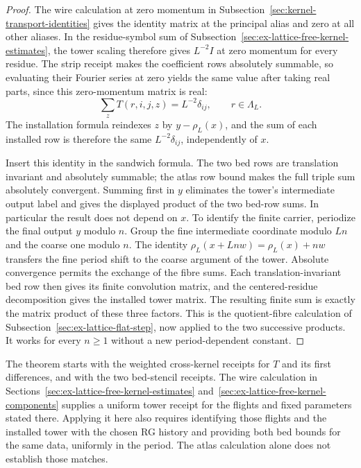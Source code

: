 \begin{proof}
The wire calculation at zero momentum in
Subsection~\ref{sec:kernel-transport-identities} gives the identity matrix at
the principal alias and zero at all other aliases. In the residue-symbol
sum of Subsection~\ref{sec:ex-lattice-free-kernel-estimates}, the tower scaling
therefore gives $L^{-2}I$ at zero momentum for every residue. The strip
receipt makes the coefficient rows absolutely summable, so evaluating their
Fourier series at zero yields the same value after taking real parts, since
this zero-momentum matrix is real:
\[
 \sum_z T(r,i,j,z)=L^{-2}\delta_{ij},\qquad r\in\Lambda_L.
\]
The installation formula reindexes $z$ by $y-\rho_L(x)$, and the sum of
each installed row is therefore the same $L^{-2}\delta_{ij}$, independently
of $x$.

Insert this identity in the sandwich formula. The two bed rows are
translation invariant and absolutely summable; the atlas row bound makes
the full triple sum absolutely convergent. Summing first in $y$ eliminates
the tower's intermediate output label and gives the displayed product of
the two bed-row sums. In particular the result does not depend on $x$.
To identify the finite carrier, periodize the final output $y$ modulo $n$.
Group the fine intermediate coordinate modulo $Ln$ and the coarse
one modulo $n$. The identity $\rho_L(x+Lnw)=\rho_L(x)+nw$ transfers
the fine period shift to the coarse argument of the tower. Absolute
convergence permits the exchange of the fibre sums. Each translation-invariant bed row
then gives its finite convolution matrix, and the centered-residue
decomposition gives the installed tower matrix. The resulting finite sum is
exactly the matrix product of these three factors. This is the quotient-fibre
calculation of Subsection~\ref{sec:ex-lattice-flat-step}, now applied to the
two successive products. It works for every $n\geq1$ without a new
period-dependent constant.
\end{proof}

\begin{remark}
The theorem starts with the weighted cross-kernel receipts for $T$ and its
first differences, and with the two bed-stencil receipts. The wire calculation
in Sections~\ref{sec:ex-lattice-free-kernel-estimates}
and~\ref{sec:ex-lattice-free-kernel-components} supplies a uniform tower
receipt for the flights and fixed parameters stated there. Applying it here
also requires identifying those flights and the installed tower with the
chosen RG history and providing both bed bounds for the same data, uniformly
in the period. The atlas calculation alone does not establish those matches.
\label{rem:ex-lattice-atlas-open}
\end{remark}
